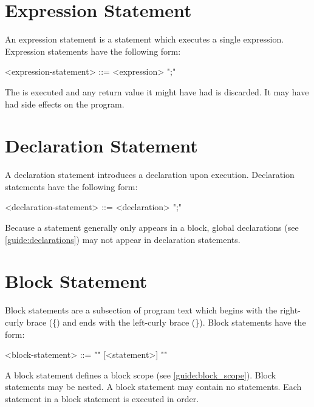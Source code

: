 \section{Expression Statement} \label{guide:expr_stmt}

An expression statement is a statement which executes a single expression. Expression statements have the following form:

\begin{minip}
\begin{grammar}
<expression-statement> ::=
<expression> ";"
\end{grammar}
\end{minip}

The  is executed and any return value it might have had is discarded. It may have had side effects on the program.

\section{Declaration Statement} \label{guide:decl_stmt}

A declaration statement introduces a declaration upon execution. Declaration statements have the following form:

\begin{minip}
\begin{grammar}
<declaration-statement> ::=
<declaration> ";"
\end{grammar}
\end{minip}

Because a statement generally only appears in a block, global declarations (see \ref{guide:declarations}) may not appear in declaration statements. 

\section{Block Statement} \label{guide:block_stmt}

Block statements are a subsection of program text which begins with the right-curly brace (\{) and ends with the left-curly brace (\}). Block statements have the form:

\begin{minip}
\begin{grammar}
<block-statement> ::=
"{" [<statement>] "}"
\end{grammar}
\end{minip}

A block statement defines a block scope (see \ref{guide:block_scope}). Block statements may be nested. A block statement may contain no statements. Each statement in a block statement is executed in order.

